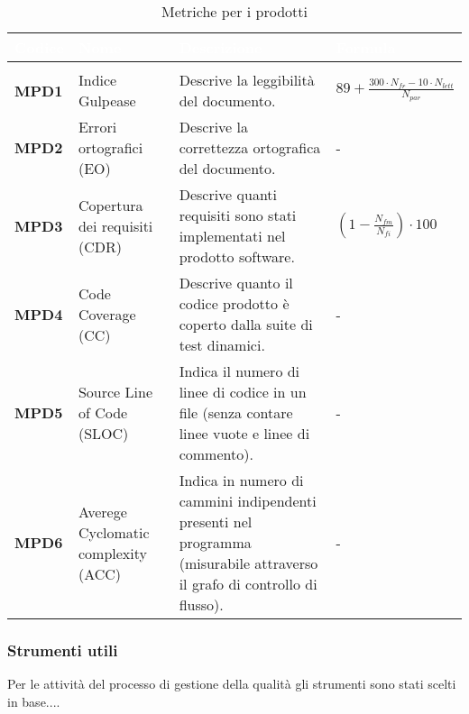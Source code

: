 \renewcommand{\arraystretch}{1.5}
\renewcommand\extrarowheight{1.5pt}
\begin{longtable}{C{1.5cm} | C{4.5cm} C{5.5cm} C{5cm}}
		\textcolor{white}{\textbf{Codice}} & 
		\textcolor{white}{\textbf{Nome}} & 
		\textcolor{white}{\textbf{Descrizione}} & 
		\textcolor{white}{\textbf{Formula}} \\
		\endfirsthead
		\\
	    \endfoot
	    \caption{Metriche per i prodotti}
	    \endlastfoot
		\hline
		\textbf{MPD1} & 
		Indice Gulpease & 
		Descrive la leggibilità del documento. & 
		$ 89 + \frac{300 \cdot N_{fr} - 10 \cdot N_{lett}}{N_{par}}$ \\
		\textbf{MPD2} & 
		Errori ortografici (EO) & 
		Descrive la correttezza ortografica del documento. & 
		- \\
		\textbf{MPD3} & 
		Copertura dei requisiti (CDR) & 
		Descrive quanti requisiti sono stati implementati nel prodotto software. &
		$(1 - \frac{N_{fm}}{N_{fi}}) \cdot 100 $ \\
		\textbf{MPD4} & 
		Code Coverage (CC) & 
		Descrive quanto il codice prodotto è coperto dalla suite di test dinamici. &
		- \\
		\textbf{MPD5} & 
		Source Line of Code (SLOC) & 
		Indica il numero di linee di codice in un file (senza contare linee vuote e linee di commento). &
		- \\
		\textbf{MPD6} & 
		Averege Cyclomatic complexity (ACC) & 
		Indica in numero di cammini indipendenti presenti nel programma (misurabile attraverso il grafo di controllo di flusso). &
		- \\
\end{longtable}

\subsubsection{Strumenti utili}
Per le attività del processo di gestione della qualità gli strumenti sono stati scelti in base.... 

 

  
